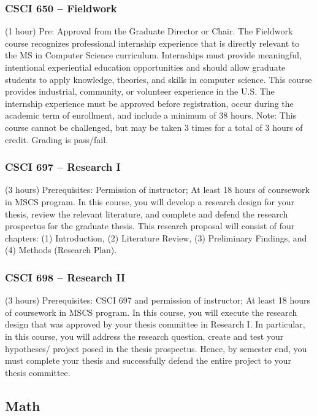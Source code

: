 \subsubsection{CSCI 650 -- Fieldwork}
(1 hour) Pre: Approval from the Graduate Director or Chair. The Fieldwork course recognizes professional internship experience that is directly relevant to the MS in Computer Science curriculum. Internships must provide meaningful, intentional experiential education opportunities and should allow graduate students to apply knowledge, theories, and skills in computer science. This course provides industrial, community, or volunteer experience in the U.S. The internship experience must be approved before registration, occur during the academic term of enrollment, and include a minimum of 38 hours. Note: This course cannot be challenged, but may be taken 3 times for a total of 3 hours of credit. Grading is pass/fail.

\subsubsection{CSCI 697 -- Research I}
(3 hours) Prerequisites: Permission of instructor; At least 18 hours of coursework in MSCS program.   In this course, you will develop a research design for your thesis, review the relevant literature, and complete and defend the research prospectus for the graduate thesis. This research proposal will consist of four chapters: (1) Introduction, (2) Literature Review, (3) Preliminary Findings, and (4) Methods (Research Plan). 

\subsubsection{CSCI 698 -- Research II}
(3 hours) Prerequisites: CSCI 697 and permission of instructor; At least 18 hours of coursework in MSCS program. In this course, you will execute the research design that was approved by your thesis committee in Research I. In particular, in this course, you will address the research question, create and test your hypotheses/ project posed in the thesis prospectus. Hence, by semester end, you must complete your thesis and successfully defend the entire project to your thesis committee. 

\subsection{Math}

